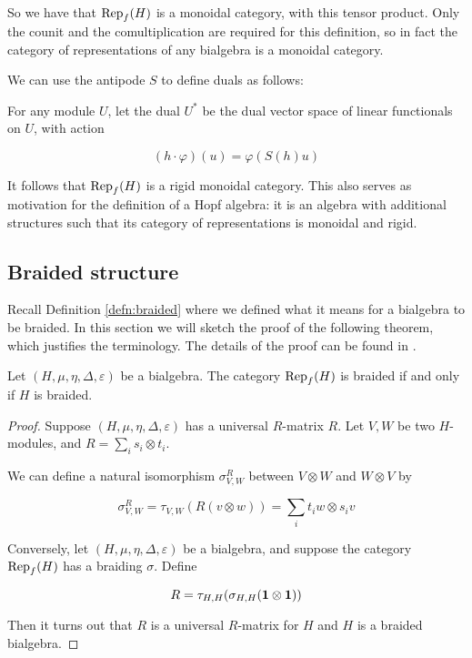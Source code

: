 So we have that $\operatorname{Rep}_f(H)$ is a monoidal category, with this tensor product.
Only the counit and the comultiplication are required for this definition, so
in fact the category of representations of any bialgebra is a monoidal
category.

We can use the antipode $S$ to define duals as follows:

For any module $U$, let the dual $U^*$ be the dual vector space of linear
functionals on $U$, with action

\begin{equation}
    (h\cdot \varphi)(u)  = \varphi(S(h) u)
\end{equation}

It follows that $\operatorname{Rep}_f(H)$ is a rigid monoidal category. This also serves as
motivation for the definition of a Hopf algebra: it is an algebra with
additional structures such that its category of representations is monoidal and
rigid. 


\subsection{Braided structure}
\label{bialgtocategory}
Recall Definition \ref{defn:braided} where we defined what it means for a
bialgebra to be braided.  In this section we will sketch the proof of the
following theorem, which justifies the terminology. The details of the proof
can be found in \cite{Kassel1994}.

\begin{theorem}
    Let $(H, \mu, \eta, \Delta, \varepsilon)$ be a bialgebra. The category $\operatorname{Rep}_f(H)$ is braided if and only if $H$ is braided. 
\end{theorem}
\begin{proof}
    Suppose $(H, \mu, \eta, \Delta, \varepsilon)$ has a universal $R$-matrix $R$. Let $V,W$ be two $H$-modules, and $R = \sum_{i} s_i \otimes t_i$. 

    We can define a natural isomorphism $\sigma_{V,W}^R$ between $V \otimes W$ and $W \otimes V$ by

    \begin{equation}
        \sigma_{V,W}^R = \tau_{V,W}(R(v \otimes w)) = \sum_{i} t_i w \otimes s_i v
    \end{equation}

    Conversely, let $(H, \mu, \eta, \Delta, \varepsilon)$ be a bialgebra, and suppose the category $\operatorname{Rep}_f(H)$ has a braiding $\sigma$. Define 

    \begin{equation}
        R = \tau_{H,H}(\sigma_{H,H}(\mathbf{1} \otimes \mathbf{1}))
    \end{equation}

    Then it turns out that $R$ is a universal $R$-matrix for $H$ and $H$ is a braided bialgebra.
\end{proof}


